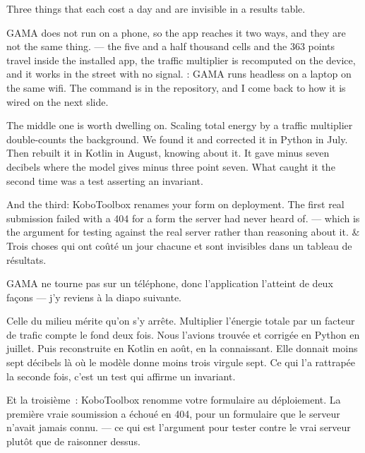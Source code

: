 \documentclass[10pt,a4paper]{article}
\begin{document}
\begin{say}
Three things that each cost a day and are invisible in a results table.

GAMA does not run on a phone, so the app reaches it two ways, and they are not
the same thing.  --- the five and a half
thousand cells and the 363 points travel inside the installed app, the traffic
multiplier is recomputed on the device, and it works in the street with no
signal. : GAMA runs headless
on a laptop on the same wifi. The command is in the repository, and I come back
to how it is wired on the next slide.

The middle one is worth dwelling on. 
Scaling total energy by a traffic multiplier double-counts the background. We
found it and corrected it in Python in July. Then rebuilt it in Kotlin in August,
knowing about it. It gave minus seven decibels where the model gives minus three
point seven.  What
caught it the second time was a test asserting an invariant.

And the third: KoboToolbox renames your form on deployment. The first real
submission failed with a 404 for a form the server had never heard of.  --- which is the argument for testing against
the real server rather than reasoning about it.
&
Trois choses qui ont coûté un jour chacune et sont invisibles dans un tableau de
résultats.

GAMA ne tourne pas sur un téléphone, donc l'application l'atteint de deux façons
--- j'y reviens à la diapo suivante.

Celle du milieu mérite qu'on s'y arrête.  Multiplier l'énergie totale par un facteur de trafic compte le fond deux
fois. Nous l'avions trouvée et corrigée en Python en juillet. Puis reconstruite en
Kotlin en août, en la connaissant. Elle donnait moins sept décibels là où le
modèle donne moins trois virgule sept.  Ce qui l'a rattrapée la seconde fois, c'est un test qui
affirme un invariant.

Et la troisième~: KoboToolbox renomme votre formulaire au déploiement. La première
vraie soumission a échoué en 404, pour un formulaire que le serveur n'avait jamais
connu.  --- ce qui est
l'argument pour tester contre le vrai serveur plutôt que de raisonner dessus.
\end{say}
\end{document}
